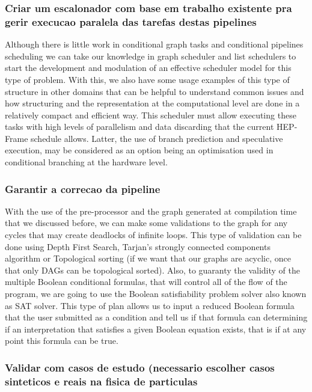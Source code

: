 \subsubsection{Criar um escalonador com base em trabalho existente pra gerir execucao paralela das tarefas destas pipelines}
Although there is little work in conditional graph tasks and conditional pipelines scheduling we can take our knowledge in graph scheduler and list schedulers to start the development and modulation of an effective scheduler model for this type of problem. With this, we also have some usage examples of this type of structure in other domains that can be helpful to understand common issues and how structuring and the representation at the computational level are done in a relatively compact and efficient way.
This scheduler must allow executing these tasks with high levels of parallelism and data discarding that the current HEP-Frame schedule allows.
Latter, the use of branch prediction and speculative execution, may be considered as an option being an optimisation used in conditional branching at the hardware level.

\subsubsection{Garantir a correcao da pipeline}
With the use of the pre-processor and the graph generated at compilation time that we discussed before, we can make some validations to the graph for any cycles that may create deadlocks of infinite loops. This type of validation can be done using Depth First Search, Tarjan's strongly connected components algorithm or Topological sorting (if we want that our graphs are acyclic, once that only DAGs can be topological sorted).
Also, to guaranty the validity of the multiple Boolean conditional formulas, that will control all of the flow of the program, we are going to use the Boolean satisfiability problem solver also known as SAT solver. This type of plan allows us to input a reduced Boolean formula that the user submitted as a condition and tell us if that formula can determining if an interpretation that satisfies a given Boolean equation exists, that is if at any point this formula can be true.

\subsubsection{Validar com casos de estudo (necessario escolher casos sinteticos e reais na fisica de particulas}

